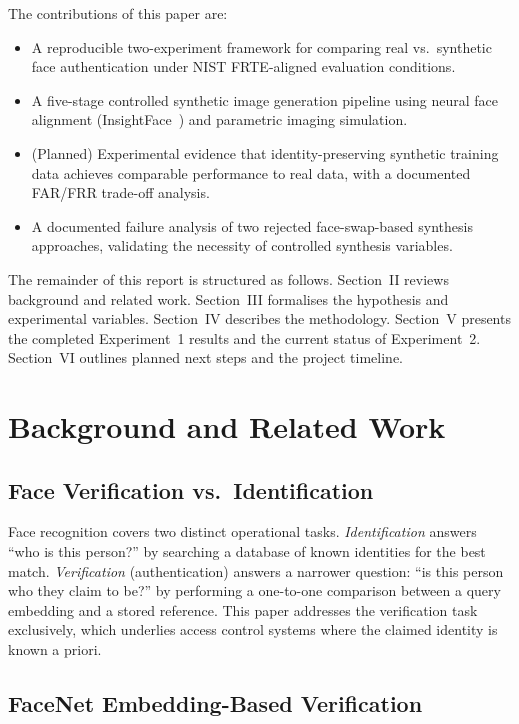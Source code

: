 \documentclass[conference]{IEEEtran}
\begin{document}
The contributions of this paper are:
\begin{itemize}
    \item A reproducible two-experiment framework for comparing real vs.\ synthetic face authentication under NIST FRTE-aligned evaluation conditions.
    \item A five-stage controlled synthetic image generation pipeline using neural face alignment (InsightFace~\cite{deng2019insightface}) and parametric imaging simulation.
    \item (Planned) Experimental evidence that identity-preserving synthetic training data achieves comparable performance to real data, with a documented FAR/FRR trade-off analysis.
    \item A documented failure analysis of two rejected face-swap-based synthesis approaches, validating the necessity of controlled synthesis variables.
\end{itemize}

The remainder of this report is structured as follows. Section~II reviews background and related work. Section~III formalises the hypothesis and experimental variables. Section~IV describes the methodology. Section~V presents the completed Experiment~1 results and the current status of Experiment~2. Section~VI outlines planned next steps and the project timeline.

\section{Background and Related Work}

\subsection{Face Verification vs.\ Identification}

Face recognition covers two distinct operational tasks. \textit{Identification} answers ``who is this person?'' by searching a database of known identities for the best match. \textit{Verification} (authentication) answers a narrower question: ``is this person who they claim to be?'' by performing a one-to-one comparison between a query embedding and a stored reference. This paper addresses the verification task exclusively, which underlies access control systems where the claimed identity is known a priori.

\subsection{FaceNet Embedding-Based Verification}
\end{document}
